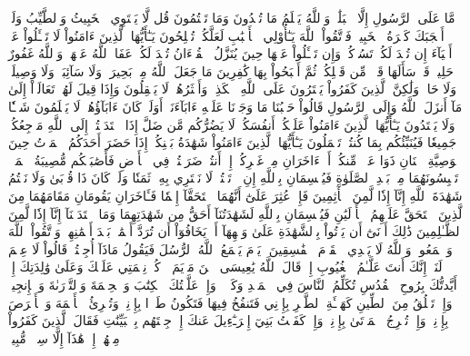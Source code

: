 مَّا عَلَى ٱلرَّسُولِ إِلَّا ٱلۡبَلَٰغُۗ وَٱللَّهُ يَعۡلَمُ مَا تُبۡدُونَ وَمَا تَكۡتُمُونَ
قُل لَّا يَسۡتَوِي ٱلۡخَبِيثُ وَٱلطَّيِّبُ وَلَوۡ أَعۡجَبَكَ كَثۡرَةُ ٱلۡخَبِيثِۚ فَٱتَّقُواْ ٱللَّهَ يَـٰٓأُوْلِي ٱلۡأَلۡبَٰبِ لَعَلَّكُمۡ تُفۡلِحُونَ
يَـٰٓأَيُّهَا ٱلَّذِينَ ءَامَنُواْ لَا تَسۡـَٔلُواْ عَنۡ أَشۡيَآءَ إِن تُبۡدَ لَكُمۡ تَسُؤۡكُمۡ وَإِن تَسۡـَٔلُواْ عَنۡهَا حِينَ يُنَزَّلُ ٱلۡقُرۡءَانُ تُبۡدَ لَكُمۡ عَفَا ٱللَّهُ عَنۡهَاۗ وَٱللَّهُ غَفُورٌ حَلِيمٞ
قَدۡ سَأَلَهَا قَوۡمٞ مِّن قَبۡلِكُمۡ ثُمَّ أَصۡبَحُواْ بِهَا كَٰفِرِينَ
مَا جَعَلَ ٱللَّهُ مِنۢ بَحِيرَةٖ وَلَا سَآئِبَةٖ وَلَا وَصِيلَةٖ وَلَا حَامٖ وَلَٰكِنَّ ٱلَّذِينَ كَفَرُواْ يَفۡتَرُونَ عَلَى ٱللَّهِ ٱلۡكَذِبَۖ وَأَكۡثَرُهُمۡ لَا يَعۡقِلُونَ
وَإِذَا قِيلَ لَهُمۡ تَعَالَوۡاْ إِلَىٰ مَآ أَنزَلَ ٱللَّهُ وَإِلَى ٱلرَّسُولِ قَالُواْ حَسۡبُنَا مَا وَجَدۡنَا عَلَيۡهِ ءَابَآءَنَآۚ أَوَلَوۡ كَانَ ءَابَآؤُهُمۡ لَا يَعۡلَمُونَ شَيۡـٔٗا وَلَا يَهۡتَدُونَ
يَـٰٓأَيُّهَا ٱلَّذِينَ ءَامَنُواْ عَلَيۡكُمۡ أَنفُسَكُمۡۖ لَا يَضُرُّكُم مَّن ضَلَّ إِذَا ٱهۡتَدَيۡتُمۡۚ إِلَى ٱللَّهِ مَرۡجِعُكُمۡ جَمِيعٗا فَيُنَبِّئُكُم بِمَا كُنتُمۡ تَعۡمَلُونَ
يَـٰٓأَيُّهَا ٱلَّذِينَ ءَامَنُواْ شَهَٰدَةُ بَيۡنِكُمۡ إِذَا حَضَرَ أَحَدَكُمُ ٱلۡمَوۡتُ حِينَ ٱلۡوَصِيَّةِ ٱثۡنَانِ ذَوَا عَدۡلٖ مِّنكُمۡ أَوۡ ءَاخَرَانِ مِنۡ غَيۡرِكُمۡ إِنۡ أَنتُمۡ ضَرَبۡتُمۡ فِي ٱلۡأَرۡضِ فَأَصَٰبَتۡكُم مُّصِيبَةُ ٱلۡمَوۡتِۚ تَحۡبِسُونَهُمَا مِنۢ بَعۡدِ ٱلصَّلَوٰةِ فَيُقۡسِمَانِ بِٱللَّهِ إِنِ ٱرۡتَبۡتُمۡ لَا نَشۡتَرِي بِهِۦ ثَمَنٗا وَلَوۡ كَانَ ذَا قُرۡبَىٰ وَلَا نَكۡتُمُ شَهَٰدَةَ ٱللَّهِ إِنَّآ إِذٗا لَّمِنَ ٱلۡأٓثِمِينَ
فَإِنۡ عُثِرَ عَلَىٰٓ أَنَّهُمَا ٱسۡتَحَقَّآ إِثۡمٗا فَـَٔاخَرَانِ يَقُومَانِ مَقَامَهُمَا مِنَ ٱلَّذِينَ ٱسۡتَحَقَّ عَلَيۡهِمُ ٱلۡأَوۡلَيَٰنِ فَيُقۡسِمَانِ بِٱللَّهِ لَشَهَٰدَتُنَآ أَحَقُّ مِن شَهَٰدَتِهِمَا وَمَا ٱعۡتَدَيۡنَآ إِنَّآ إِذٗا لَّمِنَ ٱلظَّـٰلِمِينَ
ذَٰلِكَ أَدۡنَىٰٓ أَن يَأۡتُواْ بِٱلشَّهَٰدَةِ عَلَىٰ وَجۡهِهَآ أَوۡ يَخَافُوٓاْ أَن تُرَدَّ أَيۡمَٰنُۢ بَعۡدَ أَيۡمَٰنِهِمۡۗ وَٱتَّقُواْ ٱللَّهَ وَٱسۡمَعُواْۗ وَٱللَّهُ لَا يَهۡدِي ٱلۡقَوۡمَ ٱلۡفَٰسِقِينَ
۞يَوۡمَ يَجۡمَعُ ٱللَّهُ ٱلرُّسُلَ فَيَقُولُ مَاذَآ أُجِبۡتُمۡۖ قَالُواْ لَا عِلۡمَ لَنَآۖ إِنَّكَ أَنتَ عَلَّـٰمُ ٱلۡغُيُوبِ
إِذۡ قَالَ ٱللَّهُ يَٰعِيسَى ٱبۡنَ مَرۡيَمَ ٱذۡكُرۡ نِعۡمَتِي عَلَيۡكَ وَعَلَىٰ وَٰلِدَتِكَ إِذۡ أَيَّدتُّكَ بِرُوحِ ٱلۡقُدُسِ تُكَلِّمُ ٱلنَّاسَ فِي ٱلۡمَهۡدِ وَكَهۡلٗاۖ وَإِذۡ عَلَّمۡتُكَ ٱلۡكِتَٰبَ وَٱلۡحِكۡمَةَ وَٱلتَّوۡرَىٰةَ وَٱلۡإِنجِيلَۖ وَإِذۡ تَخۡلُقُ مِنَ ٱلطِّينِ كَهَيۡـَٔةِ ٱلطَّيۡرِ بِإِذۡنِي فَتَنفُخُ فِيهَا فَتَكُونُ طَيۡرَۢا بِإِذۡنِيۖ وَتُبۡرِئُ ٱلۡأَكۡمَهَ وَٱلۡأَبۡرَصَ بِإِذۡنِيۖ وَإِذۡ تُخۡرِجُ ٱلۡمَوۡتَىٰ بِإِذۡنِيۖ وَإِذۡ كَفَفۡتُ بَنِيٓ إِسۡرَـٰٓءِيلَ عَنكَ إِذۡ جِئۡتَهُم بِٱلۡبَيِّنَٰتِ فَقَالَ ٱلَّذِينَ كَفَرُواْ مِنۡهُمۡ إِنۡ هَٰذَآ إِلَّا سِحۡرٞ مُّبِينٞ

